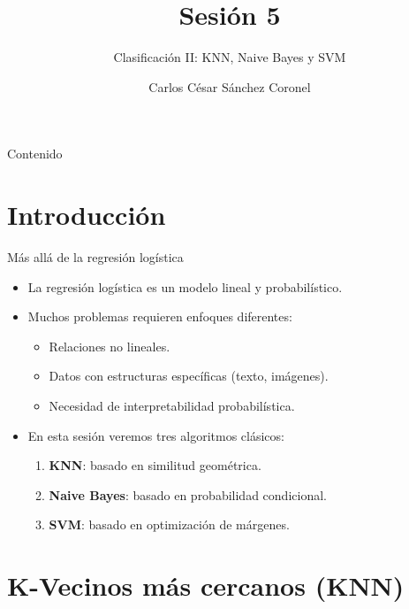 \documentclass[aspectratio=169, 10pt, xcolor=table]{beamer}
\title[SESIÓN 5]{\textbf{Sesión 5}}
\subtitle{Clasificación II: KNN, Naive Bayes y SVM}
\author[Prof. C. Sánchez]{Carlos César Sánchez Coronel}
\institute{\textbf{MACHINE LEARNING}}
\date{}
\begin{document}
\begin{frame}
    \titlepage
\end{frame}

\begin{frame}{Contenido}
    \tableofcontents
\end{frame}

\section{Introducción}

\begin{frame}{Más allá de la regresión logística}
    \begin{itemize}
        \item La regresión logística es un modelo lineal y probabilístico.
        \item Muchos problemas requieren enfoques diferentes:
        \begin{itemize}
            \item Relaciones no lineales.
            \item Datos con estructuras específicas (texto, imágenes).
            \item Necesidad de interpretabilidad probabilística.
        \end{itemize}
        \item En esta sesión veremos tres algoritmos clásicos:
        \begin{enumerate}
            \item \textbf{KNN}: basado en similitud geométrica.
            \item \textbf{Naive Bayes}: basado en probabilidad condicional.
            \item \textbf{SVM}: basado en optimización de márgenes.
        \end{enumerate}
    \end{itemize}
\end{frame}

\section{K-Vecinos más cercanos (KNN)}
\end{document}
